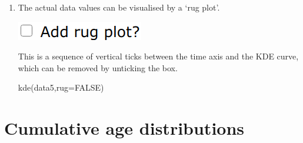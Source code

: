 \begin{refsection}
\begin{enumerate}
\item The actual data values can be visualised by a `rug plot'.

\noindent\begin{minipage}[t]{.18\linewidth}
\strut\vspace*{-\baselineskip}\newline
\includegraphics[width=\linewidth]{../figures/UPbKDErug.png}
\end{minipage}
\begin{minipage}[t]{.82\linewidth}
  This is a sequence of vertical ticks between the time axis and the
  KDE curve, which can be removed by unticking the box.
\end{minipage}

\begin{console}
kde(data5,rug=FALSE)
\end{console}
  
\end{enumerate}
  
\section{Cumulative age distributions}\label{sec:OtherCAD}


\end{refsection}
